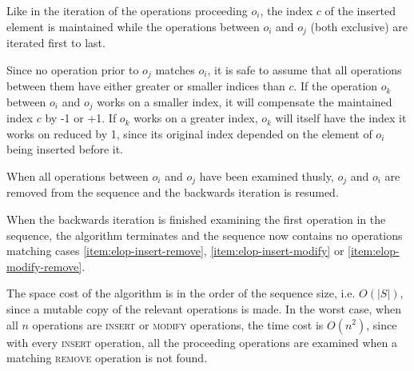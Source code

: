 Like in the iteration of the operations proceeding $o_i$, the index $c$ of the
inserted element is maintained while the operations between $o_i$ and $o_j$
(both exclusive) are iterated first to last.

Since no operation prior to $o_j$ matches $o_i$, it is safe to assume that all
operations between them have either greater or smaller indices than $c$. If the
operation $o_k$ between $o_i$ and $o_j$ works on a smaller index, it will
compensate the maintained index $c$ by -1 or +1. If $o_k$ works on a greater
index, $o_k$ will itself have the index it works on reduced by 1, since its
original index depended on the element of $o_i$ being inserted before it.

When all operations between $o_i$ and $o_j$ have been examined thusly, $o_j$ and
$o_i$ are removed from the sequence and the backwards iteration is resumed.

When the backwards iteration is finished examining the first operation in the
sequence, the algorithm terminates and the sequence now contains no operations
matching cases \ref{item:elop-insert-remove}, \ref{item:elop-insert-modify} or
\ref{item:elop-modify-remove}.

The space cost of the algorithm is in the order of the sequence size, i.e.
$O(\left|S\right|)$, since a mutable copy of the relevant operations is made.
In the worst case, when all $n$ operations are \textsc{insert} or
\textsc{modify} operations, the time cost is $O\left(n^2\right)$, since with
every \textsc{insert} operation, all the proceeding operations are examined when
a matching \textsc{remove} operation is not found.

